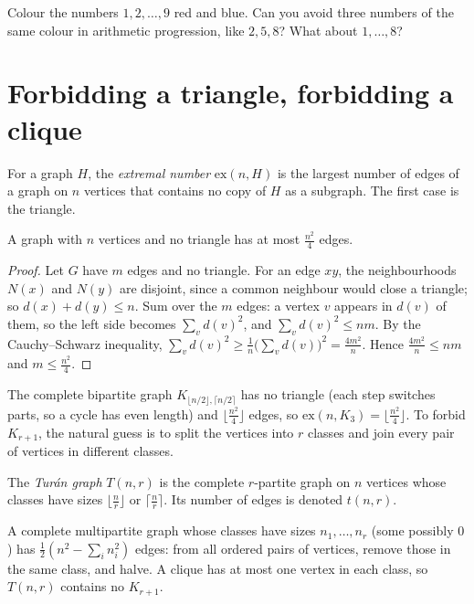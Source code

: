 \begin{think}
Colour the numbers $1,2,\dots,9$ red and blue. Can you avoid three numbers of the same colour in arithmetic progression, like $2,5,8$?
What about $1,\dots,8$?
\end{think}

\section{Forbidding a triangle, forbidding a clique}

For a graph $H$, the \emph{extremal number} $\mathrm{ex}(n,H)$ is the largest number of edges of a graph on $n$ vertices that contains no
copy of $H$ as a subgraph. The first case is the triangle.

\begin{theorem}[Mantel, 1907]\label{extremal:thm:mantel}
A graph with $n$ vertices and no triangle has at most $\frac{n^2}4$ edges.
\end{theorem}
\begin{proof}
Let $G$ have $m$ edges and no triangle. For an edge $xy$, the neighbourhoods $N(x)$ and $N(y)$ are disjoint, since a common neighbour would close a
triangle; so $d(x)+d(y)\le n$. Sum over the $m$ edges: a vertex $v$ appears in $d(v)$ of them, so the left side becomes $\sum_vd(v)^2$, and
$\sum_vd(v)^2\le nm$. By the Cauchy--Schwarz inequality, $\sum_vd(v)^2\ge\frac1n\bigl(\sum_vd(v)\bigr)^2=\frac{4m^2}n$. Hence $\frac{4m^2}n\le nm$ and
$m\le\frac{n^2}4$.
\end{proof}

The complete bipartite graph $K_{\lfloor n/2\rfloor,\lceil n/2\rceil}$ has no triangle (each step switches parts, so a cycle has even length) and
$\lfloor\frac{n^2}4\rfloor$ edges, so $\mathrm{ex}(n,K_3)=\lfloor\frac{n^2}4\rfloor$. To forbid $K_{r+1}$, the natural guess is to split the vertices into $r$
classes and join every pair of vertices in different classes.

\begin{definition}\label{extremal:def:turan}
The \emph{Tur\'an graph} $T(n,r)$ is the complete $r$-partite graph on $n$ vertices whose classes have sizes $\lfloor\frac nr\rfloor$ or
$\lceil\frac nr\rceil$. Its number of edges is denoted $t(n,r)$.
\end{definition}

A complete multipartite graph whose classes have sizes $n_1,\dots,n_r$ (some possibly $0$) has $\frac12(n^2-\sum_in_i^2)$ edges: from all ordered pairs of
vertices, remove those in the same class, and halve. A clique has at most one vertex in each class, so $T(n,r)$ contains no $K_{r+1}$.

